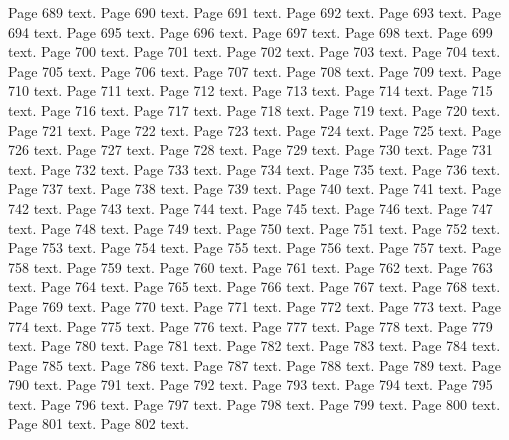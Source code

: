 \documentclass{article}
\begin{document}
Page 689 text.\newpage
Page 690 text.\newpage
Page 691 text.\newpage
Page 692 text.\newpage
Page 693 text.\newpage
Page 694 text.\newpage
Page 695 text.\newpage
Page 696 text.\newpage
Page 697 text.\newpage
Page 698 text.\newpage
Page 699 text.\newpage
Page 700 text.\newpage
Page 701 text.\newpage
Page 702 text.\newpage
Page 703 text.\newpage
Page 704 text.\newpage
Page 705 text.\newpage
Page 706 text.\newpage
Page 707 text.\newpage
Page 708 text.\newpage
Page 709 text.\newpage
Page 710 text.\newpage
Page 711 text.\newpage
Page 712 text.\newpage
Page 713 text.\newpage
Page 714 text.\newpage
Page 715 text.\newpage
Page 716 text.\newpage
Page 717 text.\newpage
Page 718 text.\newpage
Page 719 text.\newpage
Page 720 text.\newpage
Page 721 text.\newpage
Page 722 text.\newpage
Page 723 text.\newpage
Page 724 text.\newpage
Page 725 text.\newpage
Page 726 text.\newpage
Page 727 text.\newpage
Page 728 text.\newpage
Page 729 text.\newpage
Page 730 text.\newpage
Page 731 text.\newpage
Page 732 text.\newpage
Page 733 text.\newpage
Page 734 text.\newpage
Page 735 text.\newpage
Page 736 text.\newpage
Page 737 text.\newpage
Page 738 text.\newpage
Page 739 text.\newpage
Page 740 text.\newpage
Page 741 text.\newpage
Page 742 text.\newpage
Page 743 text.\newpage
Page 744 text.\newpage
Page 745 text.\newpage
Page 746 text.\newpage
Page 747 text.\newpage
Page 748 text.\newpage
Page 749 text.\newpage
Page 750 text.\newpage
Page 751 text.\newpage
Page 752 text.\newpage
Page 753 text.\newpage
Page 754 text.\newpage
Page 755 text.\newpage
Page 756 text.\newpage
Page 757 text.\newpage
Page 758 text.\newpage
Page 759 text.\newpage
Page 760 text.\newpage
Page 761 text.\newpage
Page 762 text.\newpage
Page 763 text.\newpage
Page 764 text.\newpage
Page 765 text.\newpage
Page 766 text.\newpage
Page 767 text.\newpage
Page 768 text.\newpage
Page 769 text.\newpage
Page 770 text.\newpage
Page 771 text.\newpage
Page 772 text.\newpage
Page 773 text.\newpage
Page 774 text.\newpage
Page 775 text.\newpage
Page 776 text.\newpage
Page 777 text.\newpage
Page 778 text.\newpage
Page 779 text.\newpage
Page 780 text.\newpage
Page 781 text.\newpage
Page 782 text.\newpage
Page 783 text.\newpage
Page 784 text.\newpage
Page 785 text.\newpage
Page 786 text.\newpage
Page 787 text.\newpage
Page 788 text.\newpage
Page 789 text.\newpage
Page 790 text.\newpage
Page 791 text.\newpage
Page 792 text.\newpage
Page 793 text.\newpage
Page 794 text.\newpage
Page 795 text.\newpage
Page 796 text.\newpage
Page 797 text.\newpage
Page 798 text.\newpage
Page 799 text.\newpage
Page 800 text.\newpage
Page 801 text.\newpage
Page 802 text.\newpage
\end{document}
